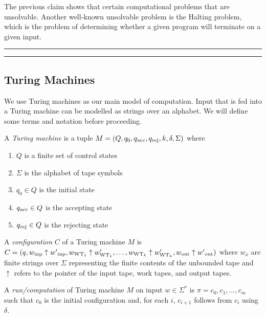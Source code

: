 \documentclass[11pt,usenames, dvipsnames]{article}
\begin{document}
The previous claim shows that certain computational problems that are unsolvable. Another well-known unsolvable problem is the Halting problem, which is the problem of determining whether a given program will terminate on a given input.

\vspace{5truemm}
\hrule
\hrule

\subsection{\large \centering Turing Machines}
\noindent

We use Turing machines as our main model of computation. Input that is fed into a Turing machine can be modelled as strings over an alphabet. We will define some terms and notation before proceeding.

\begin{definition}
  A \emph{Turing machine} is a tuple $M = (Q, q_0, q\textsubscript{acc}, q\textsubscript{rej}, k, \delta, \Sigma)$ where
  \begin{enumerate}
    \item $Q$ is a finite set of control states
    \item $\Sigma$ is the alphabet of tape symbols
    \item $q_0 \in Q$ is the initial state
    \item $q\textsubscript{acc} \in Q$ is the accepting state
    \item $q\textsubscript{rej} \in Q$ is the rejecting state
  \end{enumerate}
\end{definition}

\begin{definition}[Configuration]
  A \emph{configuration} $C$ of a Turing machine $M$ is $C = (q, w\textsubscript{inp} \uparrow w'\textsubscript{inp}, w_{\text{WT}_1} \uparrow w'_{\text{WT}_1}, \ldots, w_{\text{WT}_k} \uparrow w'_{\text{WT}_k}, w\textsubscript{out} \uparrow w'\textsubscript{out})$ where $w_x$ are finite strings over $\Sigma$ representing the finite contents of the unbounded tape and $\uparrow$ refers to the pointer of the input tape, work tapes, and output tapes.
\end{definition}

\begin{definition}
  A \emph{run/computation} of Turing machine $M$ on input $w \in \Sigma^*$ is $\pi = c_0, c_1, \ldots, c_m$ such that $c_0$ is the initial configuration and, for each $i$, $c_{i+1}$ follows from $c_i$ using $\delta$.
\end{definition}
\end{document}
